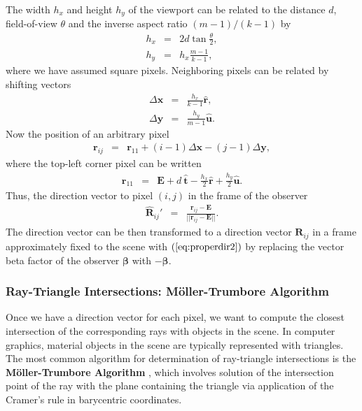 \documentclass [12pt, a4paper] {article}
\newcommand{\vu}[1]
{
	\mathbf{\hat #1}
}
\newcommand{\vc}[1]
{
	\boldsymbol{#1}
}
\begin{document}
The width $h_x$ and height $h_y$ of the viewport can be related to the 
distance $d$, field-of-view $\theta$ and the inverse aspect ratio 
$(m-1)/(k-1)$ by 
\begin {eqnarray}
    h_x &=& 2d\tan\frac{\theta}{2}, \\
    h_y &=& h_x\frac{m-1}{k-1},
\end {eqnarray}
where we have assumed square pixels. Neighboring pixels can be related by 
shifting vectors 
\begin {eqnarray}
    \Delta\vc x &=& \frac{h_x}{k - 1}\vu r, \\
    \Delta\vc y &=& \frac{h_y}{m - 1}\vu u.
\end {eqnarray}
Now the position of an arbitrary pixel 
\begin {eqnarray}
    \vc r_{ij} &=& \vc r_{11} + (i - 1)\Delta\vc x - (j - 1)\Delta\vc y,
\end {eqnarray}
where the top-left corner pixel can be written 
\begin {eqnarray}
    \vc r_{11} &=& \vc E + d\:\vu t - \frac{h_x}{2}\vu r + \frac{h_y}{2}\vu u.
\end {eqnarray}
Thus, the direction vector to pixel $(i, j)$ in the frame of the observer
\begin {eqnarray}
    \vu R_{ij}' &=& \frac{\vc r_{ij} - \vc E}{||\vc r_{ij} - \vc E||}.
\end {eqnarray}
The direction vector can be then transformed to a direction vector $\vc R_{ij}$
in a frame approximately fixed to the scene with $(\ref{eq:properdir2})$ by 
replacing the vector beta factor of the observer $\vc\beta$ with $-\vc\beta$.

\subsubsection{Ray-Triangle Intersections: M{\"o}ller-Trumbore Algorithm}
Once we have a direction vector for each pixel, we want to compute the closest 
intersection of the corresponding rays with objects in the scene. In computer 
graphics, material objects in the scene are typically represented with triangles.
The most common algorithm for determination of ray-triangle intersections is 
the \textbf{M{\"o}ller-Trumbore Algorithm} \cite{wiki_moller_trumbore}, which 
involves solution of the intersection point of the ray with the plane containing 
the triangle via application of the Cramer's rule in barycentric coordinates.
\end{document}
